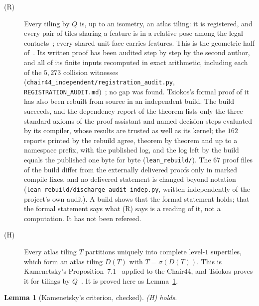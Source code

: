 \documentclass[11pt]{article}
\newtheorem{lem}{Lemma}
\theoremstyle{definition}
\theoremstyle{remark}
\newcommand{\code}[1]{\texttt{#1}}
\begin{document}
\begin{description}
\item[(R)] Every tiling by $Q$ is, up to an isometry, an atlas tiling: it is registered, and every pair of tiles sharing a
feature is in a relative pose among the legal contacts~\cite[Thm~5.6, Lemma~5.3]{Tsiokos1}; every shared unit face carries
features.  This is the geometric half of~\cite{Tsiokos1}.  Its written proof has been audited step by step by the second
author, and all of its finite inputs recomputed in exact arithmetic, including each of the $5{,}273$ collision witnesses
(\code{chair44\_independent/registration\_audit.py}, \code{REGISTRATION\_AUDIT.md})~\cite{Romanov}; no gap was found.
Tsiokos's formal proof of it~\cite{Tsiokos1} has also been rebuilt from source in an independent build.  The build
succeeds, and the dependency report of the theorem lists only the three standard axioms of the proof assistant and named
decision steps evaluated by its compiler, whose results are trusted as well as its kernel; the $162$ reports printed by the
rebuild agree, theorem by theorem and up to a namespace prefix, with the published log, and the log left by the build equals the published one byte
for byte (\code{lean\_rebuild/}).  The $67$ proof files of the build differ from the externally delivered proofs only in
marked compile fixes, and no delivered statement is changed beyond notation (\code{lean\_rebuild/discharge\_audit\_indep.py},
written independently of the project's own audit).  A build shows that the formal statement holds; that the formal statement says what
(R) says is a reading of it, not a computation.  It has not been refereed.
\item[(H)] Every atlas tiling $T$ partitions uniquely into complete level-$1$ supertiles, which form an atlas tiling $D(T)$
with $T=\sigma(D(T))$.  This is Kamenetsky's Proposition~7.1~\cite{Kamenetsky} applied to the Chair44, and Tsiokos
proves it for tilings by $Q$~\cite[Thms~6.4, 6.5]{Tsiokos1}.  It is proved here as Lemma~\ref{lem:hier}.
\end{description}

\begin{lem}[Kamenetsky's criterion, checked]
\label{lem:hier}
(H) holds.
\end{lem}
\end{document}

